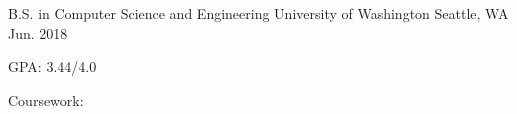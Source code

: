 

\begin{cventries}

  \cventry
    {B.S. in Computer Science and Engineering} %
    {University of Washington} %
    {Seattle, WA} %
    {Jun. 2018} %
    {
      \begin{cvitems} %
        \item {GPA: 3.44/4.0}
        \item {
          Coursework:
          \newline\quad
          \newline\quad
        }
      \end{cvitems}
    }

\end{cventries}
